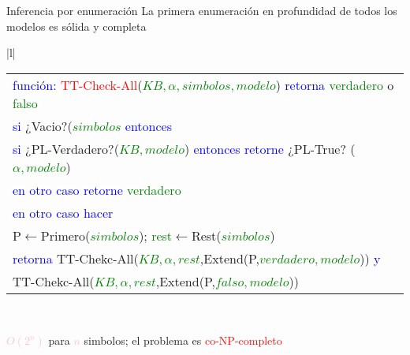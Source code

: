     \begin{frame}{Inferencia por enumeración}
    La primera enumeración en profundidad de todos los modelos es sólida y completa\\
        \begin{table}[]
        \resizebox{9cm}{!} {
        \begin{tabular}{|l|}
        \hline
         \\ \hline
        \begin{tabular}[c]{@{}l@{}}
            \textcolor{Blue}{función:} \textcolor{Red}{TT-Check-All}(\textcolor{Green}{$KB,\alpha,simbolos,modelo$}) \textcolor{Blue}{retorna} \textcolor{Green}{verdadero} o \textcolor{Green}{falso}\\
            \quad\textcolor{Blue}{si} ¿Vacio?(\textcolor{Green}{$simbolos$} \textcolor{Blue}{entonces}\\
            \qquad\textcolor{Blue}{si} ¿PL-Verdadero?(\textcolor{Green}{$KB,modelo$}) \textcolor{Blue}{entonces retorne} ¿PL-True? (\textcolor{Green}{$\alpha,modelo$})\\
            \qquad\textcolor{Blue}{en otro caso retorne} \textcolor{Green}{verdadero}\\
            \quad\textcolor{Blue}{en otro caso hacer}\\
            \qquad P$\leftarrow$Primero(\textcolor{Green}{$simbolos$});           \textcolor{Green}{rest}$\leftarrow$Rest(\textcolor{Green}{$simbolos$})\\
            \qquad\textcolor{Blue}{retorna} TT-Chekc-All(\textcolor{Green}{$KB,\alpha,rest$},Extend(P,\textcolor{Green}{$verdadero,modelo$})) \textcolor{Blue}{y}\\
            \qquad\qquad\qquad TT-Chekc-All(\textcolor{Green}{$KB,\alpha,rest$},Extend(P,\textcolor{Green}{$falso,modelo$}))
        \end{tabular}\\ \hline
        \end{tabular}
        }
        \end{table}
    \textcolor{Pink}{$O(2^n)$} para \textcolor{Pink}{$n$} simbolos; el problema es
    \textcolor{Red}{co-NP-completo}
        
    \end{frame}